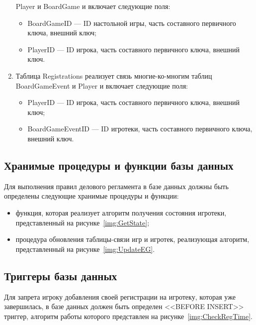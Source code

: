 \begin{enumerate}
        Player и BoardGame  и включает следующие поля:
        \begin{itemize}[leftmargin=\parindent]
            \item BoardGameID --- ID настольной игры, часть составного
                первичного ключа, внешний ключ;
            \item PlayerID --- ID игрока, часть составного
                первичного ключа, внешний ключ.
        \end{itemize}
    \item Таблица Registrations реализует связь многие-ко-многим таблиц
        BoardGameEvent и Player и включает следующие поля:
        \begin{itemize}[leftmargin=\parindent]
            \item PlayerID --- ID игрока, часть составного
                первичного ключа, внешний ключ;
            \item BoardGameEventID --- ID игротеки, часть составного
                первичного ключа, внешний ключ.
        \end{itemize}
\end{enumerate}


\subsection{Хранимые процедуры и функции базы данных}

Для выполнения правил делового регламента в базе данных должны быть определены
следующие хранимые процедуры и функции:
\begin{itemize}
    \item функция, которая реализует алгоритм получения состояния игротеки,
        представленный на рисунке~\ref{img:GetState};
    \item процедура обновления таблицы-связи игр и игротек, реализующая
        алгоритм, представленный на рисунке~\ref{img:UpdateEG}.
\end{itemize}


\subsection{Триггеры базы данных}

Для запрета игроку добавления своей регистрации на игротеку, которая уже
завершилась, в базе данных должен быть определен <<BEFORE INSERT>> триггер,
алгоритм работы которого представлен на рисунке~\ref{img:CheckRegTime}.

